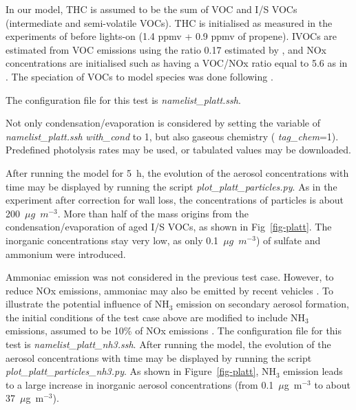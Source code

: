 \documentclass[a4paper,11pt]{article}
\begin{document}
In our model, THC is assumed to be the sum of VOC and I/S VOCs (intermediate and semi-volatile VOCs). THC is initialised as measured in the experiments of \cite{platt2013secondary} before lights-on (1.4 ppmv + 0.9 ppmv of propene). IVOCs are estimated from VOC emissions using the ratio 0.17 estimated by \cite{zhao2016intermediate}, and NOx concentrations are initialised such as having a VOC/NOx ratio equal to 5.6 as in \cite{platt2013secondary} . 
The speciation of VOCs to model species was done following \cite{theloke2007}.

The configuration file for this test is {\it{namelist\_platt.ssh}}.

Not only condensation/evaporation is considered by setting the variable of {\it{namelist\_platt.ssh}} {\it{with\_cond}} to 1, but also gaseous chemistry ( {\it{tag\_chem}}=1). Predefined photolysis rates may be used, or tabulated values may be downloaded.

After running the model for 5~h, the evolution of the aerosol concentrations with time may be displayed by running the script {\it{plot\_platt\_particles.py}}.
As in the experiment after correction for wall loss, the concentrations of
particles is about 200~$\mu g$~$m^{-3}$. More than half of the mass origins
from the condensation/evaporation of aged I/S VOCs, as shown in Fig~\ref{fig-platt}.
The inorganic concentrations stay very low, as only 0.1~$\mu g$~$m^{-3}$) of sulfate and ammonium were introduced.

Ammoniac emission was not considered in the previous test case. However, to reduce NOx emissions, ammoniac may also be emitted by recent vehicles \cite{suarez17}. 
To illustrate the potential influence of NH$_3$ emission on secondary aerosol formation, the initial conditions of the test case above are modified to include NH$_3$ emissions, assumed to be 10\% of NOx emissions \cite{suarez17}. 
The configuration file for this test is {\it{namelist\_platt\_nh3.ssh}}.
After running the model, the evolution of the aerosol concentrations with time may be displayed by running the script {\it{plot\_platt\_particles\_nh3.py}}.
As shown in Figure~\ref{fig-platt}, NH$_3$ emission leads to a large increase in inorganic aerosol concentrations (from 0.1~$\mu$g~m$^{-3}$ to about 37~$\mu$g~m$^{-3}$).
\end{document}
